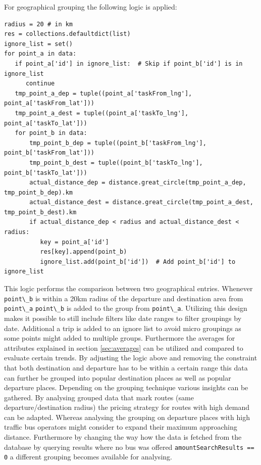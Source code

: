 For geographical grouping the following logic is applied:
\begin{lstlisting}
radius = 20 # in km
res = collections.defaultdict(list)
ignore_list = set()
for point_a in data:
   if point_a['id'] in ignore_list:  # Skip if point_b['id'] is in ignore_list
      continue
   tmp_point_a_dep = tuple((point_a['taskFrom_lng'], point_a['taskFrom_lat']))
   tmp_point_a_dest = tuple((point_a['taskTo_lng'], point_a['taskTo_lat']))
   for point_b in data:
	   tmp_point_b_dep = tuple((point_b['taskFrom_lng'], point_b['taskFrom_lat']))
       tmp_point_b_dest = tuple((point_b['taskTo_lng'], point_b['taskTo_lat']))
       actual_distance_dep = distance.great_circle(tmp_point_a_dep, tmp_point_b_dep).km
       actual_distance_dest = distance.great_circle(tmp_point_a_dest, tmp_point_b_dest).km
       if actual_distance_dep < radius and actual_distance_dest < radius:
          key = point_a['id']
          res[key].append(point_b)
          ignore_list.add(point_b['id'])  # Add point_b['id'] to ignore_list
\end{lstlisting}
This logic performs the comparison between two geographical entries. Whenever \verb|point\_b| is within a 20km radius of the departure and destination area from \verb|point\_a| \verb|point\_b| is added to the group from \verb|point\_a|. Utilizing this design makes it possible to still include filters like date ranges to filter groupings by date. Additional a trip is added to an ignore list to avoid micro groupings as some points might added to multiple groups. Furthermore the averages for attributes explained in section \ref{sec:averages} can be utilized and compared to evaluate certain trends. By adjusting the logic above and removing the constraint that both destination and departure has to be within a certain range this data can further be grouped into popular destination places as well as popular departure places. Depending on the grouping technique various insights can be gathered. By analysing grouped data that mark routes (same departure/destination radius) the pricing strategy for routes with high demand can be adapted. Whereas analysing the grouping on departure places with high traffic bus operators might consider to expand their maximum approaching distance. Furthermore by changing the way how the data is fetched from the database by querying results where no bus was offered \verb|amountSearchResults == 0| a different grouping becomes available for analysing. 
